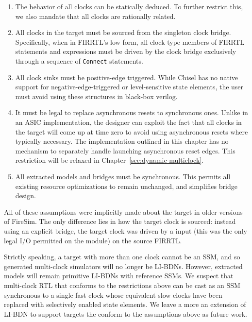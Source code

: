 \begin{enumerate}
\item The behavior of all clocks can be statically deduced. To further restrict
    this, we also mandate that all clocks are rationally related.

\item All clocks in the target must be sourced from the singleton clock bridge.
    Specifically, when in FIRRTL's low form, all clock-type members of FIRRTL
    statements and expressions must be driven by the clock bridge
    exclusively through a sequence of \texttt{Connect} statements.

\item All clock sinks must be positive-edge triggered. While Chisel has no
    native support for negative-edge-triggered or level-sensitive state elements, the
    user must avoid using these structures in black-box verilog.

\item It must be legal to replace asynchronous resets to synchronous ones. Unlike in 
    an ASIC implementation, the designer can exploit the fact that all clocks
    in the target will come up at time zero to avoid using asynchronous
    resets where typically necessary. The implementation outlined in this chapter has no mechanism to
    separately handle launching asynchronous reset edges. This restriction
    will be relaxed in Chapter~\ref{sec:dynamic-multiclock}.
\item All extracted models and bridges must be synchronous. This permits all existing resource optimizations to remain unchanged,
    and simplifies bridge design.

\end{enumerate}

All of these assumptions were implicitly made about the target in
older versions of FireSim. The only difference lies in how the target clock is
sourced: instead using an explicit bridge, the target clock was driven by a
input (this was the only legal I/O permitted on the module) on the source
FIRRTL.

Strictly speaking, a target with more than one clock cannot be an SSM, and so
generated multi-clock simulators will no longer be LI-BDNs. However, extracted
models will remain primitive LI-BDNs with reference SSMs.  We suspect that
multi-clock RTL that conforms to the restrictions above can be cast as an SSM
synchronous to a single fast clock whose equivalent slow clocks have been
replaced with selectively enabled state elements. We leave a more an extension of LI-BDN
to support targets the conform to the assumptions above as future work.

